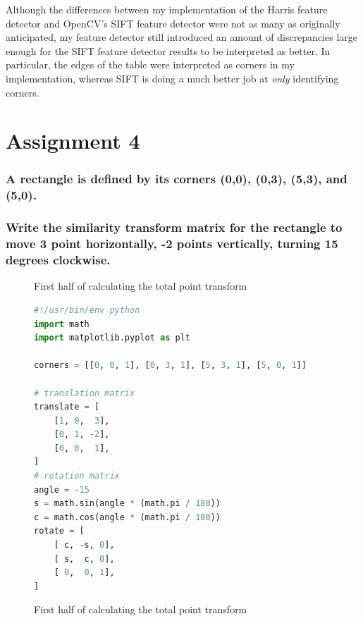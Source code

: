 \documentclass[a4paper, titlepage,12pt]{article}
\begin{document}
	Although the differences between my implementation of the Harris feature detector and OpenCV's SIFT feature detector were not as many as originally anticipated, my feature detector still introduced an amount of discrepancies large enough for the SIFT feature detector results to be interpreted as better. In particular, the edges of the table were interpreted as corners in my implementation, whereas SIFT is doing a much better job at \textit{only} identifying corners.

	\section*{Assignment 4}

	\subsubsection*{A rectangle is defined by its corners (0,0), (0,3), (5,3), and (5,0).}

	\subsubsection*{Write the similarity transform matrix for the rectangle to move 3 point horizontally, -2 points vertically, turning 15 degrees clockwise.}

	\begin{figure}[H]
	\caption{First half of calculating the total point transform}
	\begin{center}
	\begin{lstlisting}[language=Python]
	#!/usr/bin/env python
import math
import matplotlib.pyplot as plt

corners = [[0, 0, 1], [0, 3, 1], [5, 3, 1], [5, 0, 1]]

# translation matrix
translate = [
    [1, 0,  3],
    [0, 1, -2],
    [0, 0,  1],
]
# rotation matrix
angle = -15
s = math.sin(angle * (math.pi / 180))
c = math.cos(angle * (math.pi / 180))
rotate = [
    [ c, -s, 0],
    [ s,  c, 0],
    [ 0,  0, 1],
]
	\end{lstlisting}
	\caption{First half of calculating the total point transform}
	\label{trans-1}
	\end{center}
	\end{figure}
\end{document}
